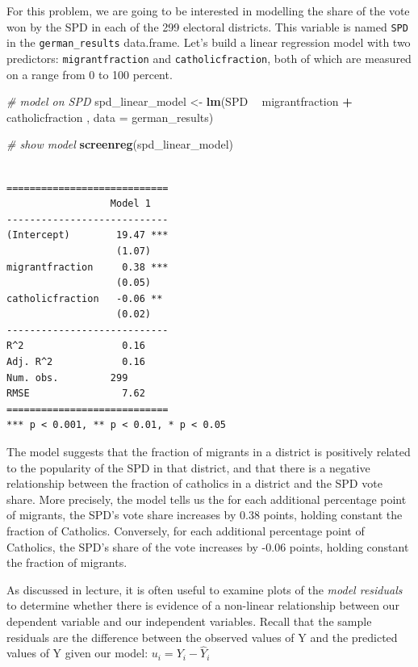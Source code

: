 \documentclass[]{article}
\newenvironment{Shaded}{\begin{snugshade}}{\end{snugshade}}
\newcommand{\KeywordTok}[1]{\textcolor[rgb]{0.13,0.29,0.53}{\textbf{#1}}}
\newcommand{\DataTypeTok}[1]{\textcolor[rgb]{0.13,0.29,0.53}{#1}}
\newcommand{\StringTok}[1]{\textcolor[rgb]{0.31,0.60,0.02}{#1}}
\newcommand{\CommentTok}[1]{\textcolor[rgb]{0.56,0.35,0.01}{\textit{#1}}}
\newcommand{\OperatorTok}[1]{\textcolor[rgb]{0.81,0.36,0.00}{\textbf{#1}}}
\newcommand{\NormalTok}[1]{#1}
\theoremstyle{definition}
\theoremstyle{definition}
\theoremstyle{definition}
\theoremstyle{remark}
\begin{document}
For this problem, we are going to be interested in modelling the share
of the vote won by the SPD in each of the 299 electoral districts. This
variable is named \texttt{SPD} in the \texttt{german\_results}
data.frame. Let's build a linear regression model with two predictors:
\texttt{migrantfraction} and \texttt{catholicfraction}, both of which
are measured on a range from 0 to 100 percent.

\begin{Shaded}
\begin{Highlighting}[]
\CommentTok{# model on SPD}
\NormalTok{spd_linear_model <-}\StringTok{ }\KeywordTok{lm}\NormalTok{(SPD }\OperatorTok{~}\StringTok{ }\NormalTok{migrantfraction }\OperatorTok{+}\StringTok{ }\NormalTok{catholicfraction , }\DataTypeTok{data =}\NormalTok{ german_results)}

\CommentTok{# show model}
\KeywordTok{screenreg}\NormalTok{(spd_linear_model)}
\end{Highlighting}
\end{Shaded}

\begin{verbatim}

============================
                  Model 1   
----------------------------
(Intercept)        19.47 ***
                   (1.07)   
migrantfraction     0.38 ***
                   (0.05)   
catholicfraction   -0.06 ** 
                   (0.02)   
----------------------------
R^2                 0.16    
Adj. R^2            0.16    
Num. obs.         299       
RMSE                7.62    
============================
*** p < 0.001, ** p < 0.01, * p < 0.05
\end{verbatim}

The model suggests that the fraction of migrants in a district is
positively related to the popularity of the SPD in that district, and
that there is a negative relationship between the fraction of catholics
in a district and the SPD vote share. More precisely, the model tells us
the for each additional percentage point of migrants, the SPD's vote
share increases by 0.38 points, holding constant the fraction of
Catholics. Conversely, for each additional percentage point of
Catholics, the SPD's share of the vote increases by -0.06 points,
holding constant the fraction of migrants.

As discussed in lecture, it is often useful to examine plots of the
\emph{model residuals} to determine whether there is evidence of a
non-linear relationship between our dependent variable and our
independent variables. Recall that the sample residuals are the
difference between the observed values of Y and the predicted values of
Y given our model: \(u_i = Y_i - \hat{Y}_i\)
\end{document}
